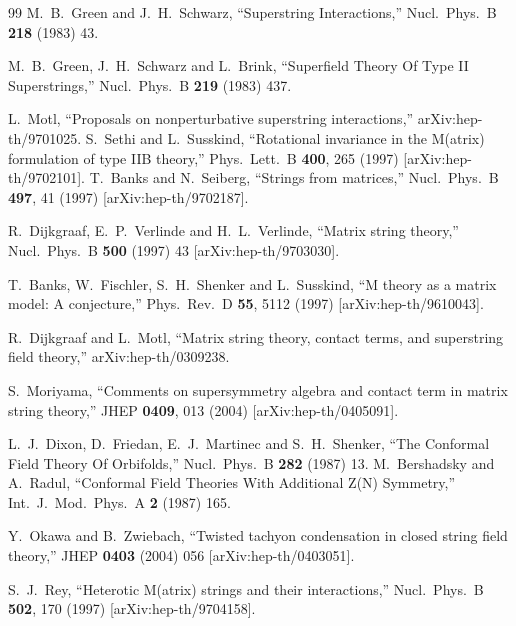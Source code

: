 \documentclass[12pt]{article}
\begin{document}
\begin{thebibliography}{99}
M.~B.~Green and J.~H.~Schwarz,
``Superstring Interactions,''
Nucl.\ Phys.\ B {\bf 218} (1983) 43.

M.~B.~Green, J.~H.~Schwarz and L.~Brink,
``Superfield Theory Of Type II Superstrings,''
Nucl.\ Phys.\ B {\bf 219} (1983) 437.

L.~Motl,
``Proposals on nonperturbative superstring interactions,''
arXiv:hep-th/9701025.
S.~Sethi and L.~Susskind,
``Rotational invariance in the M(atrix) formulation of type IIB theory,''
Phys.\ Lett.\ B {\bf 400}, 265 (1997)
[arXiv:hep-th/9702101].
T.~Banks and N.~Seiberg,
``Strings from matrices,''
Nucl.\ Phys.\ B {\bf 497}, 41 (1997)
[arXiv:hep-th/9702187].

R.~Dijkgraaf, E.~P.~Verlinde and H.~L.~Verlinde,
``Matrix string theory,''
Nucl.\ Phys.\ B {\bf 500} (1997) 43
[arXiv:hep-th/9703030].

T.~Banks, W.~Fischler, S.~H.~Shenker and L.~Susskind,
``M theory as a matrix model: A conjecture,''
Phys.\ Rev.\ D {\bf 55}, 5112 (1997)
[arXiv:hep-th/9610043].

R.~Dijkgraaf and L.~Motl,
``Matrix string theory, contact terms, and superstring field theory,''
arXiv:hep-th/0309238.

S.~Moriyama,
``Comments on supersymmetry algebra and contact term in matrix string
theory,''
JHEP {\bf 0409}, 013 (2004)
[arXiv:hep-th/0405091].

L.~J.~Dixon, D.~Friedan, E.~J.~Martinec and S.~H.~Shenker,
``The Conformal Field Theory Of Orbifolds,''
Nucl.\ Phys.\ B {\bf 282} (1987) 13.
M.~Bershadsky and A.~Radul,
``Conformal Field Theories With Additional Z(N) Symmetry,''
Int.\ J.\ Mod.\ Phys.\ A {\bf 2} (1987) 165.

Y.~Okawa and B.~Zwiebach,
``Twisted tachyon condensation in closed string field theory,''
JHEP {\bf 0403} (2004) 056
[arXiv:hep-th/0403051].

S.~J.~Rey,
``Heterotic M(atrix) strings and their interactions,''
Nucl.\ Phys.\  B {\bf 502}, 170 (1997)
[arXiv:hep-th/9704158].


\end{thebibliography}
\end{document}
